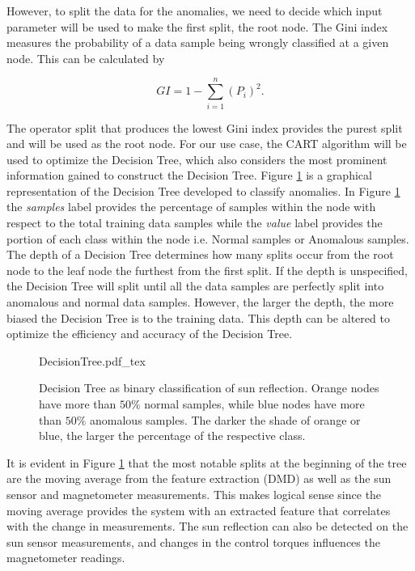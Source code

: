 However, to split the data for the anomalies, we need to decide which input parameter will be used to make the first split, the root node. The Gini index measures the probability of a data sample being wrongly classified at a given node. This can be calculated by

\begin{equation}
GI = 1 - \sum_{i = 1}^{n}{(P_i)^2}.
\label{eq:Gini index}
\end{equation}

The operator split that produces the lowest Gini index provides the purest split and will be used as the root node. For our use case, the CART algorithm will be used to optimize the Decision Tree, which also considers the most prominent information gained to construct the Decision Tree. Figure \ref{fig:DecisionTree} is a graphical representation of the Decision Tree developed to classify anomalies. In Figure \ref{fig:DecisionTree} the \emph{samples} label provides the percentage of samples within the node with respect to the total training data samples while the \emph{value} label provides the portion of each class within the node i.e. Normal samples or Anomalous samples. The depth of a Decision Tree determines how many splits occur from the root node to the leaf node the furthest from the first split. If the depth is unspecified, the Decision Tree will split until all the data samples are perfectly split into anomalous and normal data samples. However, the larger the depth, the more biased the Decision Tree is to the training data. This depth can be altered to optimize the efficiency and accuracy of the Decision Tree.

\begin{figure}[!hbt]
	\centering
	\def\svgwidth{16cm}
	{DecisionTree.pdf_tex}
	\caption{Decision Tree as binary classification of sun reflection. Orange nodes have more than $50\%$ normal samples, while blue nodes have more than $50\%$ anomalous samples. The darker the shade of orange or blue, the larger the percentage of the respective class.}
	\label{fig:DecisionTree}
\end{figure}

It is evident in Figure \ref{fig:DecisionTree} that the most notable splits at the beginning of the tree are the moving average from the feature extraction (DMD) as well as the sun sensor and magnetometer measurements. This makes logical sense since the moving average provides the system with an extracted feature that correlates with the change in measurements. The sun reflection can also be detected on the sun sensor measurements, and changes in the control torques influences the magnetometer readings.

